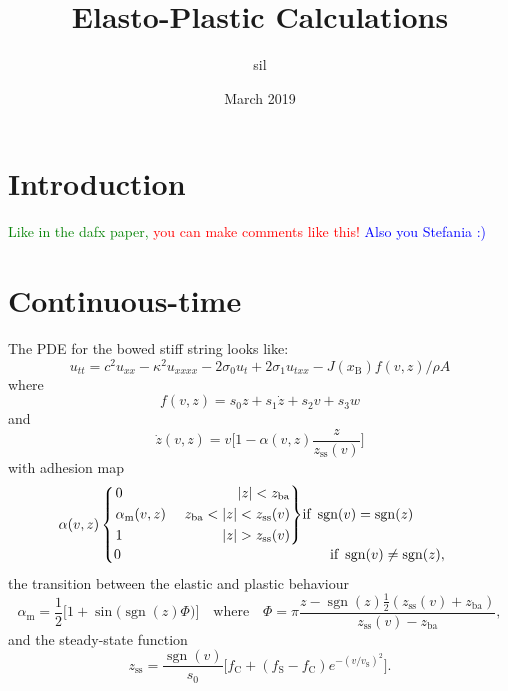 \documentclass{article}
\title{Elasto-Plastic Calculations}
\author{sil }
\date{March 2019}
\newenvironment{rcases}
  {\left.\begin{alignedat}{2}}
  {\end{alignedat}\right\rbrace}
\DeclareMathOperator{\sgn}{sgn}
\def\SBcomment[#1]{\textcolor{Red}{#1}}
\def\SWcomment[#1]{\textcolor{Green}{#1}}
\def\SScomment[#1]{\textcolor{Blue}{#1}}
\begin{document}
\maketitle

\section{Introduction}
\SWcomment[Like in the dafx paper, ]\SBcomment[you can make comments like this!] \SScomment[Also you Stefania :)]
\section{Continuous-time}
The PDE for the bowed stiff string looks like:
\begin{equation}
    u_{tt} = c^2u_{xx}-\kappa^2u_{xxxx}-2\sigma_0u_t+2\sigma_1u_{txx}-J(x_\text{B})f(v,z)/\rho A
\end{equation}
where
\begin{equation}
    f(v, z) = s_0z + s_1\dot z + s_2v + s_3w
\end{equation}
and 
\begin{equation}\label{eq:zdot}
    \dot z(v, z) = v\bigg[1-\alpha(v, z)\frac{z}{z_\text{ss}(v)}\bigg]
\end{equation}
with adhesion map
\begin{equation}\label{eq:alpha}
\alpha(v, z) 
    \begin{cases}
    \begin{rcases}
        &0 & |z| < z_\text{ba}\\
       &\alpha_\text{m}(v,z)&\quad \  z_\text{ba}<|z|<z_\text{ss}(v)\\
        &1 &|z|>z_\text{ss}(v)
        \end{rcases}\text{if}\  \sgn(v)=\sgn(z)\\
        0\qquad \qquad \qquad \qquad \qquad \qquad \qquad\ \ \; \text{if}\  \sgn(v)\neq\sgn(z),
    \end{cases}
\end{equation}
the transition between the elastic and plastic behaviour
\begin{equation}
    \alpha_\text{m} = \frac{1}{2}\big[1+\sin\big(\sgn(z)\Phi\big)\big]\quad \text{where}\quad \Phi = \pi\frac{z-\sgn(z)\frac{1}{2}(z_\text{ss}(v)+z_\text{ba})}{z_\text{ss}(v)-z_\text{ba}},
\end{equation}
and the steady-state function
\begin{equation}\label{eq:zss}
    z_\text{ss} = \frac{\sgn(v)}{s_0}\Big[f_\text{C}+(f_\text{S}-f_\text{C})e^{-(v/v_\text{S})^2}\Big].
\end{equation}
\end{document}

